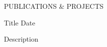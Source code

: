 
\begin{ResumeSection}{PUBLICATIONS \& PROJECTS}

    \begin{DatedField}
        {Title}
        {Date}
        {}
        {}
        \item Description
    \end{DatedField}

\end{ResumeSection} 
